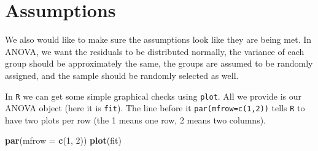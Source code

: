 \documentclass[]{tufte-book}
\newenvironment{Shaded}{}{}
\newcommand{\KeywordTok}[1]{\textcolor[rgb]{0.00,0.44,0.13}{\textbf{#1}}}
\newcommand{\DataTypeTok}[1]{\textcolor[rgb]{0.56,0.13,0.00}{#1}}
\newcommand{\DecValTok}[1]{\textcolor[rgb]{0.25,0.63,0.44}{#1}}
\newcommand{\NormalTok}[1]{#1}
\theoremstyle{definition}
\theoremstyle{definition}
\theoremstyle{remark}
\begin{document}
\section*{Assumptions}\label{assumptions}

We also would like to make sure the assumptions look like they are being
met. In ANOVA, we want the residuals to be distributed normally, the
variance of each group should be approximately the same, the groups are
assumed to be randomly assigned, and the sample should be randomly
selected as well.

In \texttt{R} we can get some simple graphical checks using
\texttt{plot}. All we provide is our ANOVA object (here it is
\texttt{fit}). The line before it \texttt{par(mfrow=c(1,2))} tells
\texttt{R} to have two plots per row (the 1 means one row, 2 means two
columns).

\begin{Shaded}
\begin{Highlighting}[]
\KeywordTok{par}\NormalTok{(}\DataTypeTok{mfrow =} \KeywordTok{c}\NormalTok{(}\DecValTok{1}\NormalTok{, }\DecValTok{2}\NormalTok{))}
\KeywordTok{plot}\NormalTok{(fit)}
\end{Highlighting}
\end{Shaded}
\end{document}
